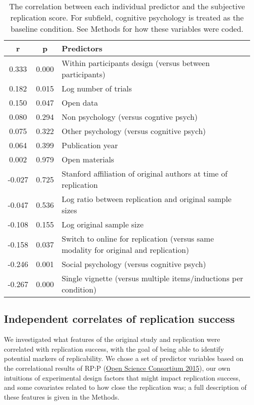 \documentclass[
  english,
  a4paper,
]{article}
\begin{document}
\begin{table}[!h]

\caption{\label{tab:cor}The correlation between each individual predictor and the subjective replication score. For subfield, cognitive psychology is treated as the baseline condition. See Methods for how these variables were coded.}
\centering
\fontsize{10}{12}\selectfont
\begin{tabular}[t]{ccl}
\toprule
r & p & Predictors\\
\midrule
0.333 & 0.000 & Within participants design (versus between participants)\\
0.182 & 0.015 & Log number of  trials\\
0.150 & 0.047 & Open data\\
0.080 & 0.294 & Non psychology (versus cogntive psych)\\
0.075 & 0.322 & Other psychology (versus cognitive psych)\\
0.064 & 0.399 & Publication year\\
0.002 & 0.979 & Open materials\\
-0.027 & 0.725 & Stanford affiliation of original authors at time of replication\\
-0.047 & 0.536 & Log ratio between replication and original sample sizes\\
-0.108 & 0.155 & Log original sample size\\
-0.158 & 0.037 & Switch to online for replication (versus same modality for original and replication)\\
-0.246 & 0.001 & Social psychology (versus cognitive psych)\\
-0.267 & 0.000 & Single vignette (versus multiple items/inductions per condition)\\
\bottomrule
\end{tabular}
\end{table}

\hypertarget{independent-correlates-of-replication-success}{%
\subsection{Independent correlates of replication success}\label{independent-correlates-of-replication-success}}

We investigated what features of the original study and replication were correlated with replication success, with the goal of being able to identify potential markers of replicability. We chose a set of predictor variables based on the correlational results of RP:P (\protect\hyperlink{ref-openscienceconsortium2015}{Open Science Consortium 2015}), our own intuitions of experimental design factors that might impact replication success, and some covariates related to how close the replication was; a full description of these features is given in the Methods.
\end{document}
